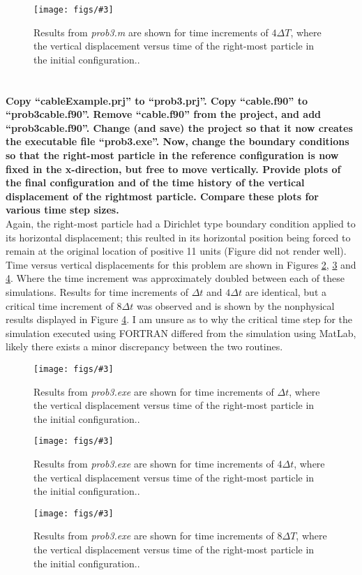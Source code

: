 \documentclass[letterpaper, 10pt, oneside]{article}
\newenvironment{dd}[1]{
	\noindent
	\textbf{\normalsize{#1}}
	\hspace{0.1in}
	\small
	\rmfamily
	}
	{\medskip}
\newcommand{\bdd}{\begin{dd}}
\newcommand{\edd}{\end{dd}}
\newcommand{\Figure}[4]{
  \begin{figure}[#1]
    \centering
    \texttt{[image: figs/\#3]}
    \caption{#4.}\label{fig:#3}
  \end{figure}}
\begin{document}
\Figure{htp}{4}{3_2_4dt.pdf}{Results from \emph{prob3.m} are shown for time increments of $4\Delta T$, where the vertical displacement versus time of the right-most particle in the initial configuration.}

\edd
\section{}
\bdd{Copy “cableExample.prj” to “prob3.prj”. Copy “cable.f90” to “prob3cable.f90”. Remove “cable.f90” from the project, and add “prob3cable.f90”. Change (and save) the project so that it now creates the executable file “prob3.exe”. Now, change the boundary conditions so that the right-most particle in the reference configuration is now fixed in the x-direction, but free to move vertically. Provide plots of the final configuration and of the time history of the vertical displacement of the rightmost particle. Compare these plots for various time step sizes.} \\

Again, the right-most particle had a Dirichlet type boundary condition applied to its horizontal displacement; this reulted in its horizontal position being forced to remain at the original location of positive 11 units (Figure did not render well). Time versus vertical displacements for this problem are shown in Figures \ref{fig:4_2_1dt.pdf}, \ref{fig:4_2_4dt.pdf} and \ref{fig:4_2_8dt.pdf}. Where the time increment was approximately doubled between each of these simulations.  Results for time increments of $\Delta t$ and $4\Delta t$ are identical, but a critical time increment of $8\Delta t$ was observed and is shown by the nonphysical results displayed in Figure \ref{fig:4_2_8dt.pdf}. I am unsure as to why the critical time step for the simulation executed using FORTRAN differed from the simulation using MatLab, likely there exists a minor discrepancy between the two routines.

\Figure{htp}{5}{4_2_1dt.pdf}{Results from \emph{prob3.exe} are shown for time increments of $\Delta t$, where the vertical displacement versus time of the right-most particle in the initial configuration.}

\Figure{htp}{5}{4_2_4dt.pdf}{Results from \emph{prob3.exe} are shown for time increments of $4\Delta t$, where the vertical displacement versus time of the right-most particle in the initial configuration.}

\Figure{t!}{5}{4_2_8dt.pdf}{Results from \emph{prob3.exe} are shown for time increments of $8\Delta T$, where the vertical displacement versus time of the right-most particle in the initial configuration.}

\null
\vfill
\edd
\end{document}
